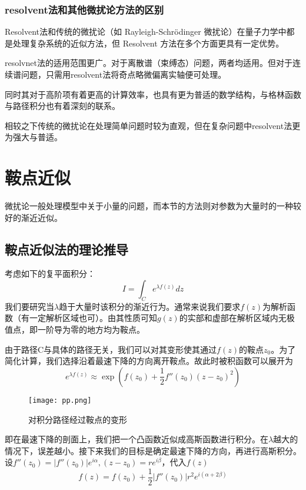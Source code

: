 \documentclass[12pt, a4paper, oneside]{ctexart}
\begin{document}
\subsubsection{resolvent法和其他微扰论方法的区别}
Resolvent法和传统的微扰论（如 Rayleigh-Schrödinger 微扰论）在量子力学中都是处理复杂系统的近似方法，但 Resolvent 方法在多个方面更具有一定优势。

resolvnet法的适用范围更广。对于离散谱（束缚态）问题，两者均适用。但对于连续谱问题，只需用resolvent法将奇点略微偏离实轴便可处理。

同时其对于高阶项有着更高的计算效率，也具有更为普适的数学结构，与格林函数与路径积分也有着深刻的联系。

相较之下传统的微扰论在处理简单问题时较为直观，但在复杂问题中resolvent法更为强大与普适。

\newpage
\section{鞍点近似}
微扰论一般处理模型中关于小量的问题，而本节的方法则对参数为大量时的一种较好的渐近近似。
\subsection{鞍点近似法的理论推导}
考虑如下的复平面积分：
\begin{equation}
    I=\int_C e^{\lambda f(z)}dz
\end{equation}
我们要研究当$\lambda$趋于大量时该积分的渐近行为。通常来说我们要求$f(z)$为解析函数（有一定解析区域也可）。由其性质可知$g(z)$的实部和虚部在解析区域内无极值点，即一阶导为零的地方均为鞍点。

由于路径C与具体的路径无关，我们可以对其变形使其通过$f(z)$的鞍点$z_0$。为了简化计算，我们选择沿着最速下降的方向离开鞍点。故此时被积函数可以展开为
\begin{equation}
    e^{\lambda f(z)}\approx \exp(f(z_0)+\frac{1}{2}f''(z_0)(z-z_0)^2)
\end{equation}
\begin{figure}[htbp]
    \centering
    \texttt{[image: pp.png]}
    \vspace{10pt} %
	\caption{对积分路径经过鞍点的变形}
\end{figure}
即在最速下降的剖面上，我们把一个凸函数近似成高斯函数进行积分。在$\lambda$越大的情况下，误差越小。接下来我们的目标是确定最速下降的方向，再进行高斯积分。设$f''(z_0)=|f''(z_0)|e^{i\alpha},(z-z_0)=re^{i\beta}$，代入$f(z)$
\begin{equation}
    f(z)=f(z_0)+\frac{1}{2}|f''(z_0)|r^2e^{i(\alpha+2\beta)}
\end{equation}
\end{document}

